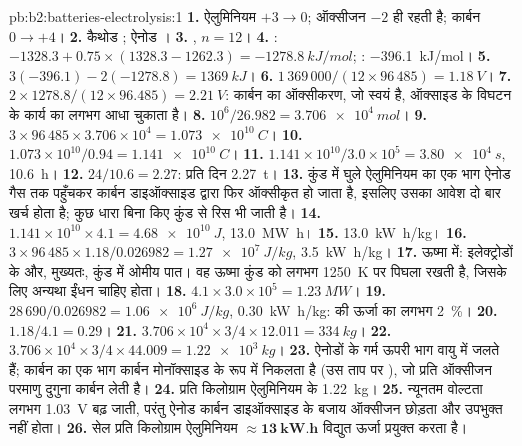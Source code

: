 \begin{solution}{pb:b2:batteries-electrolysis:1}
\textbf{1.} ऐलुमिनियम $+3 \to 0$; ऑक्सीजन $-2$ ही रहती है; कार्बन $0 \to +4$।
\textbf{2.} कैथोड ; ऐनोड ।
\textbf{3.} , $n = 12$।
\textbf{4.} : $-1328.3 + 0.75 \times (1328.3 - 1262.3) = \qty{-1278.8}{kJ/mol}$;
: \qty{-396.1}{kJ/mol}।
\textbf{5.} $3(-396.1) - 2(-1278.8) = \qty{+1369}{kJ}$।
\textbf{6.} $1\,369\,000/(12 \times 96\,485) = \qty{1.18}{V}$।
\textbf{7.} $2 \times 1278.8/(12 \times 96.485) = \qty{2.21}{V}$: कार्बन का ऑक्सीकरण,
जो स्वयं  है, ऑक्साइड के विघटन के कार्य का लगभग आधा चुकाता है।
\textbf{8.} $10^6/26.982 = \qty{3.706e4}{mol}$।
\textbf{9.} $3 \times 96\,485 \times 3.706 \times 10^4 = \qty{1.073e10}{C}$।
\textbf{10.} $1.073 \times 10^{10}/0.94 = \qty{1.141e10}{C}$।
\textbf{11.} $1.141 \times 10^{10}/3.0 \times 10^5 = \qty{3.80e4}{s}$, \qty{10.6}{h}।
\textbf{12.} $24/10.6 = 2.27$: प्रति दिन \qty{2.27}{t}।
\textbf{13.} कुंड में घुले ऐलुमिनियम का एक भाग ऐनोड गैस तक पहुँचकर
कार्बन डाइऑक्साइड द्वारा फिर ऑक्सीकृत हो जाता है, इसलिए उसका आवेश दो बार खर्च होता है; कुछ धारा
बिना  किए कुंड से रिस भी जाती है।
\textbf{14.} $1.141 \times 10^{10} \times 4.1 = \qty{4.68e10}{J}$, \qty{13.0}{MW.h}।
\textbf{15.} \qty{13.0}{kW.h/kg}।
\textbf{16.} $3 \times 96\,485 \times 1.18/0.026982 = \qty{1.27e7}{J/kg}$, \qty{3.5}{kW.h/kg}।
\textbf{17.} ऊष्मा में: इलेक्ट्रोडों के  और, मुख्यतः, कुंड में
ओमीय पात। वह ऊष्मा कुंड को लगभग
\qty{1250}{K} पर पिघला रखती है, जिसके लिए अन्यथा ईंधन चाहिए होता।
\textbf{18.} $4.1 \times 3.0 \times 10^5 = \qty{1.23}{MW}$।
\textbf{19.} $28\,690/0.026982 = \qty{1.06e6}{J/kg}$, \qty{0.30}{kW.h/kg}:  की
ऊर्जा का लगभग 2~\%।
\textbf{20.} $1.18/4.1 = 0.29$।
\textbf{21.} $3.706 \times 10^4 \times 3/4 \times 12.011 = \qty{334}{kg}$।
\textbf{22.} $3.706 \times 10^4 \times 3/4 \times 44.009 = \qty{1.22e3}{kg}$।
\textbf{23.} ऐनोडों के गर्म ऊपरी भाग वायु में जलते हैं; कार्बन का एक भाग
कार्बन मोनॉक्साइड के रूप में निकलता है (उस ताप पर ), जो प्रति ऑक्सीजन परमाणु
दुगुना कार्बन लेती है।
\textbf{24.} प्रति किलोग्राम ऐलुमिनियम  के \qty{1.22}{kg}।
\textbf{25.} न्यूनतम वोल्टता लगभग \qty{1.03}{V} बढ़ जाती, परंतु ऐनोड
कार्बन डाइऑक्साइड के बजाय ऑक्सीजन छोड़ता और उपभुक्त नहीं होता।
\textbf{26.} सेल प्रति किलोग्राम ऐलुमिनियम $\boldsymbol{\approx \qty{13}{kW.h}}$ विद्युत
ऊर्जा प्रयुक्त करता है।
\end{solution}
